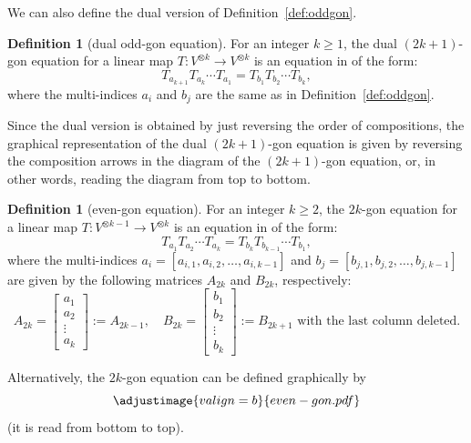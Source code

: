 \documentclass[10pt,a4paper]{amsart}
\numberwithin{equation}{section}
\theoremstyle{definition}
\newtheorem{Definition}[Theorem]{Definition}
\begin{document}
We can also define the dual version of Definition~\ref{def:oddgon}.

\begin{Definition}[dual odd-gon equation]\label{def:dual oddgon}
 For an integer $k\geq 1$, the dual $(2k+1)$-gon equation for a linear map $T\colon V^{\otimes k}\to V^{\otimes k}$ is an equation in  of the form:
 \begin{equation*}
 T_{a_{k+1}}T_{a_k}\cdots T_{a_1} = T_{b_1}T_{b_2}\cdots T_{b_k},
 \end{equation*}
 where the multi-indices $a_i$ and $b_j$ are the same as in Definition~\ref{def:oddgon}.

 Since the dual version is obtained by just reversing the order of compositions, the graphical representation of the dual $(2k+1)$-gon equation is given by reversing the composition arrows in the diagram of the $(2k+1)$-gon equation, or, in other words, reading the diagram from top to bottom.
\end{Definition}

\begin{Definition}[even-gon equation]\label{def:evengon}
 For an integer $k\geq 2$, the $2k$-gon equation for a linear map $T\colon V^{\otimes k-1}\to V^{\otimes k}$ is an equation in  of the form:
 \begin{equation*}
 T_{a_1}T_{a_2}\cdots T_{a_{k}} = T_{b_{k}}T_{b_{k-1}}\cdots T_{b_1},
 \end{equation*}
 where the multi-indices $a_i=[a_{i,1},a_{i,2},\dots, a_{i,k-1}]$ and $b_j=[b_{j,1},b_{j,2},\dots, b_{j,k-1}]$ are given by the following matrices $A_{2k}$ and $B_{2k}$, respectively:
 \begin{equation*}
 A_{2k}=\begin{bmatrix}
 a_1\\
 a_2\\
 \vdots\\
 a_{k}
 \end{bmatrix}:=A_{2k-1},\quad
 B_{2k} = \begin{bmatrix}
 b_1\\
 b_2\\
 \vdots\\
 b_{k}
 \end{bmatrix}
 := \text{$B_{2k+1}$ with the last column deleted.}
 \end{equation*}

 Alternatively, the $2k$-gon equation can be defined graphically by
 \begin{equation*}
 \adjustimage{valign=b}{even-gon.pdf}
 \end{equation*}
 (it is read from bottom to top).
\end{Definition}
\end{document}
